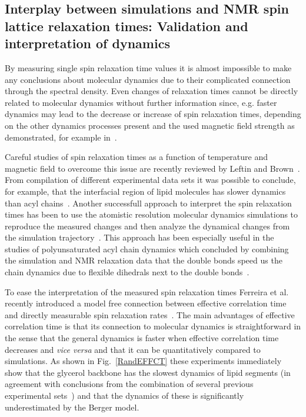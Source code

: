 \documentclass[aps,prl,superscriptaddress,twocolumn]{revtex4}
\begin{document}
\subsection{Interplay between simulations and NMR spin lattice relaxation times: Validation and interpretation of dynamics}

By measuring single spin relaxation time values it is almost impossible to make any conclusions
about molecular dynamics due to their complicated connection through the spectral density.
Even changes of relaxation times cannot be directly related to molecular dynamics without further
information since, e.g. faster dynamics may lead to the decrease or increase of spin relaxation times,
depending on the other dynamics processes present and the used magnetic field strength as demonstrated, for example in~\cite{ferreira15}.

Careful studies of spin relaxation times as a function of temperature and magnetic field to overcome this issue are 
recently reviewed by Leftin and Brown~\cite{leftin11}. From compilation of different experimental data sets it was possible 
to conclude, for example, that the interfacial region of lipid molecules has slower dynamics than acyl chains~\cite{leftin11}.
Another successfull approach to interpret the spin relaxation times has been to use the atomistic resolution molecular dynamics
simulations to reproduce the measured changes and then analyze the dynamical changes from the simulation trajectory~\cite{feller02,eldho03,nowacka13}.
This approach has been especially useful in the studies of polyunsaturated acyl chain dynamics which concluded
by combining the simulation and NMR relaxation data that the double bonds speed us the chain dynamics
due to flexible dihedrals next to the double bonds~\cite{feller02,eldho03,gawrisch03,stillwell03}.

To ease the interpretation of the measured spin relaxation times Ferreira et al. recently introduced a model
free connection between effective correlation time and directly measurable spin relaxation rates~\cite{ferreira15}.
The main advantages of effective correlation time is that its connection to molecular dynamics is straightforward in
the sense that the general dynamics is faster when effective correlation time decreases and {\it vice versa} and
that it can be quantitatively compared to simulations. As shown in Fig.~\ref{RandEFFCT} these experiments
immediately show that the glycerol backbone has the slowest dynamics of lipid segments (in agreement with conclusions from the
combination of several previous experimental sets~\cite{leftin11}) and that the dynamics
of these is significantly underestimated by the Berger model.
\end{document}
